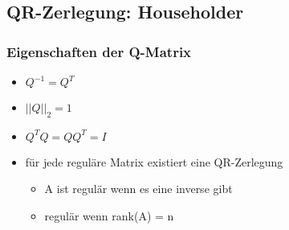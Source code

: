\subsection{QR-Zerlegung: Householder}

\subsubsection*{Eigenschaften der Q-Matrix}
\begin{itemize}

	\item $Q^{-1} = Q^T$
	
	\item $||Q||_2 = 1$
	
	\item $Q^TQ = QQ^T = I$
	
	\item für jede reguläre Matrix existiert eine QR-Zerlegung
	\begin{itemize}
	
		\item A ist regulär wenn es eine inverse gibt
		
		\item regulär wenn rank(A) = n	
	
	\end{itemize}
	
\end{itemize}

